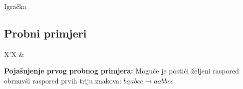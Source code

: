 \begin{statement}[
  problempoints=100,
  timelimit=1 sekunda,
  memorylimit=512 MiB,
]{Igračka}
\subsection*{Probni primjeri}
\begin{tabularx}{\textwidth}{X'X}
 &
\end{tabularx}

\textbf{Pojašnjenje prvog probnog primjera:}
Moguće je postići željeni raspored obrnuvši raspored prvih triju znakova:
$\underline{baa}bcc \rightarrow aabbcc$

\end{statement}

